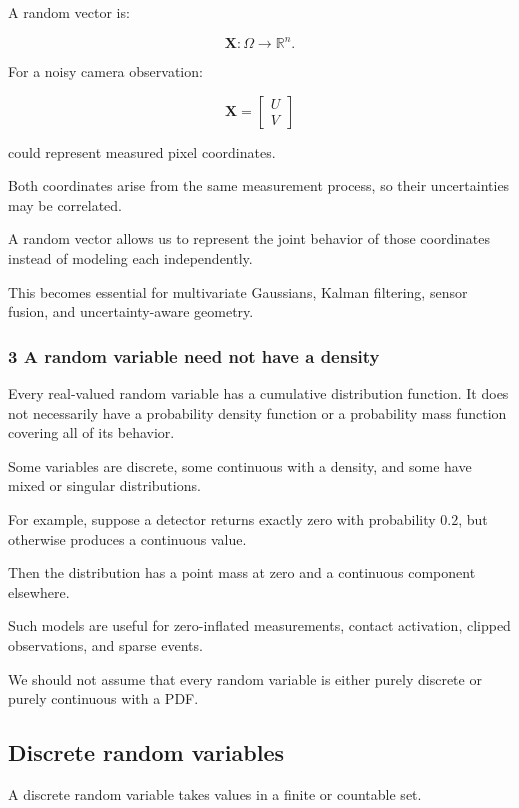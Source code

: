 A random vector is:

\[
 \mathbf X:\Omega\rightarrow\mathbb R^n.
\]

For a noisy camera observation:

\[
 \mathbf X= \begin{bmatrix} U\\V \end{bmatrix}
\]

could represent measured pixel coordinates.

Both coordinates arise from the same measurement process, so their uncertainties may be correlated.

A random vector allows us to represent the joint behavior of those coordinates instead of modeling each independently.

This becomes essential for multivariate Gaussians, Kalman filtering, sensor fusion, and uncertainty-aware geometry.

\subsubsection{3 A random variable need not have a density}\label{02-foundations-ii-ch023-a-random-variable-need-not-have-a-density}

Every real-valued random variable has a cumulative distribution function. It does not necessarily have a probability density function or a probability mass function covering all of its behavior.

Some variables are discrete, some continuous with a density, and some have mixed or singular distributions.

For example, suppose a detector returns exactly zero with probability \(0.2\), but otherwise produces a continuous value.

Then the distribution has a point mass at zero and a continuous component elsewhere.

Such models are useful for zero-inflated measurements, contact activation, clipped observations, and sparse events.

We should not assume that every random variable is either purely discrete or purely continuous with a PDF.

\subsection{Discrete random variables}\label{02-foundations-ii-ch023-discrete-random-variables}

A discrete random variable takes values in a finite or countable set.

